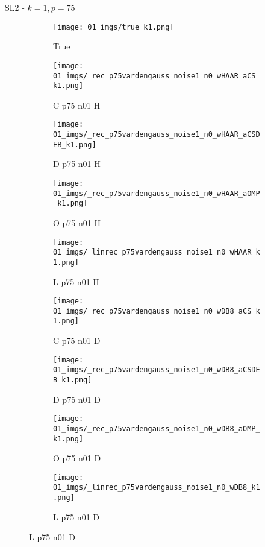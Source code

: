 \begin{frame}{SL2 - $k=1,p=75$}{}
\begin{figure}
\begin{subfigure}{0.1\textwidth}
\texttt{[image: 01\_imgs/true\_k1.png]}
\caption*{\Tiny True}
\end{subfigure}
\begin{subfigure}{0.1\textwidth}
\texttt{[image: 01\_imgs/\_rec\_p75vardengauss\_noise1\_n0\_wHAAR\_aCS\_k1.png]}
\caption*{\Tiny C p75 n01 H}
\end{subfigure}
\begin{subfigure}{0.1\textwidth}
\texttt{[image: 01\_imgs/\_rec\_p75vardengauss\_noise1\_n0\_wHAAR\_aCSDEB\_k1.png]}
\caption*{\Tiny D p75 n01 H}
\end{subfigure}
\begin{subfigure}{0.1\textwidth}
\texttt{[image: 01\_imgs/\_rec\_p75vardengauss\_noise1\_n0\_wHAAR\_aOMP\_k1.png]}
\caption*{\Tiny O p75 n01 H}
\end{subfigure}
\begin{subfigure}{0.1\textwidth}
\texttt{[image: 01\_imgs/\_linrec\_p75vardengauss\_noise1\_n0\_wHAAR\_k1.png]}
\caption*{\Tiny L p75 n01 H}
\end{subfigure}
\begin{subfigure}{0.1\textwidth}
\texttt{[image: 01\_imgs/\_rec\_p75vardengauss\_noise1\_n0\_wDB8\_aCS\_k1.png]}
\caption*{\Tiny C p75 n01 D}
\end{subfigure}
\begin{subfigure}{0.1\textwidth}
\texttt{[image: 01\_imgs/\_rec\_p75vardengauss\_noise1\_n0\_wDB8\_aCSDEB\_k1.png]}
\caption*{\Tiny D p75 n01 D}
\end{subfigure}
\begin{subfigure}{0.1\textwidth}
\texttt{[image: 01\_imgs/\_rec\_p75vardengauss\_noise1\_n0\_wDB8\_aOMP\_k1.png]}
\caption*{\Tiny O p75 n01 D}
\end{subfigure}
\begin{subfigure}{0.1\textwidth}
\texttt{[image: 01\_imgs/\_linrec\_p75vardengauss\_noise1\_n0\_wDB8\_k1.png]}
\caption*{\Tiny L p75 n01 D}
\end{subfigure}

\vspace{5pt}


\end{figure}
\end{frame}
